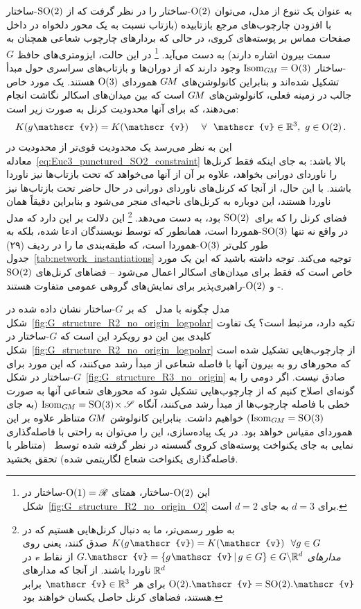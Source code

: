 به عنوان یک تنوع از مدل، می‌توان $\operatorname{O}(2)$-ساختار را در نظر گرفت که از $\operatorname{SO}(2)$-ساختار با افزودن چارچوب‌های مرجع بازتابیده (بازتاب نسبت به یک محور دلخواه در داخل صفحات مماس بر پوسته‌های کروی، در حالی که بردارهای چارچوب شعاعی همچنان به سمت بیرون اشاره دارند) به دست می‌آید.%
\footnote{
	این $\operatorname{O}(2)$-ساختار، همتای $\operatorname{O}(1) = \mathscr{R}$-ساختار در شکل~\ref{fig:G_structure_R2_no_origin_O2} برای $d=3$ به جای $d=2$ است.
}
در این حالت، ایزومتری‌های حافظ $G$-ساختار $\operatorname{Isom}_{G\mkern-1.4muM} = \operatorname{O}(3)$ وجود دارند که از دوران‌ها و بازتاب‌های سراسری حول مبدأ تشکیل شده‌اند و بنابراین کانولوشن‌های $G\mkern-1.4muM$ هموردای $\operatorname{O}(3)$ هستند.
یک مورد خاص جالب در زمینه فعلی، کانولوشن‌های $G\mkern-1.4muM$ است که بین میدان‌های اسکالر نگاشت انجام می‌دهند، که برای آنها محدودیت کرنل به صورت زیر است:
\begin{align}\label{eq:Euc3_punctured_O2_constraint}
	K(g\mkern1mu \mathscr{v}) = K(\mathscr{v}) \quad\ \forall\ \ \mathscr{v}\in\R^3,\ g\in\O2 \,.
\end{align}
این به نظر می‌رسد یک محدودیت قوی‌تر از محدودیت در معادله~\eqref{eq:Euc3_punctured_SO2_constraint} بالا باشد:
به جای اینکه فقط کرنل‌ها را ناوردای دورانی بخواهد، علاوه بر آن از آنها می‌خواهد که تحت بازتاب‌ها نیز ناوردا باشند.
با این حال، از آنجا که کرنل‌های ناوردای دورانی در حال حاضر تحت بازتاب‌ها نیز ناوردا هستند، این دوباره به کرنل‌های ناحیه‌ای منجر می‌شود و بنابراین دقیقاً همان فضای کرنل را که برای~$\operatorname{SO}(2)$ بود، به دست می‌دهد.%
\footnote{
	به طور رسمی‌تر، ما به دنبال کرنل‌هایی هستیم که در $K(g\mkern1mu \mathscr{v}) = K(\mathscr{v})\ \ \forall g\in G$ صدق کنند، یعنی روی \emph{مدارهای} $G.\mathscr{v} = \{g\mkern1mu \mathscr{v} \,|\, g\in G\} \in G \backslash \R^d$ از نقاط $\mathscr{v}$ در $\mathbb{R}^d$ ناوردا باشند.
	از آنجا که مدارهای $\O2.\mathscr{v} = \SO2.\mathscr{v}$ برای هر $\mathscr{v}\in\R^3$ برابر هستند، فضاهای کرنل حاصل یکسان خواهند بود.
}
این دلالت بر این دارد که مدل \citet{ramasinghe2019representation} در واقع نه تنها $\operatorname{SO}(3)$-هموردا است، همانطور که توسط نویسندگان ادعا شده، بلکه به طور کلی‌تر $\operatorname{O}(3)$-هموردا است، که طبقه‌بندی ما را در ردیف (۲۹) جدول~\ref{tab:network_instantiations} توجیه می‌کند.
توجه داشته باشید که این یک مورد خاص است که فقط برای میدان‌های اسکالر اعمال می‌شود -- فضاهای کرنل‌های $\operatorname{SO}(2)$- و $\operatorname{O}(2)$-راهبری‌پذیر برای نمایش‌های گروهی عمومی متفاوت هستند.


مدل \citet{ramasinghe2019representation} چگونه با مدل~\citet{esteves2017polar} که بر $G$-ساختار نشان داده شده در شکل~\ref{fig:G_structure_R2_no_origin_logpolar} تکیه دارد، مرتبط است؟
یک تفاوت کلیدی بین این دو رویکرد این است که $G$-ساختار در شکل~\ref{fig:G_structure_R2_no_origin_logpolar} از چارچوب‌هایی تشکیل شده است که محورهای رو به بیرون آنها با فاصله شعاعی از مبدأ رشد می‌کنند، که این مورد برای $G$-ساختار در شکل~\ref{fig:G_structure_R3_no_origin} صادق نیست.
اگر دومی را به گونه‌ای اصلاح کنیم که از چارچوب‌هایی تشکیل شود که محورهای شعاعی آنها به صورت خطی با فاصله چارچوب‌ها از مبدأ رشد می‌کنند، آنگاه $\operatorname{Isom}_{G\mkern-1.4muM} = \operatorname{SO}(3) \!\times \mathscr{S}$ (به جای $\operatorname{Isom}_{G\mkern-1.4muM} = \operatorname{SO}(3)$) خواهیم داشت.
بنابراین کانولوشن $G\mkern-1.4muM$ متناظر علاوه بر این هموردای مقیاس خواهد بود.
در یک پیاده‌سازی، این را می‌توان به راحتی با فاصله‌گذاری نمایی به جای یکنواخت پوسته‌های کروی گسسته در نظر گرفته شده توسط~\citet{ramasinghe2019representation} (متناظر با فاصله‌گذاری یکنواخت شعاع لگاریتمی شده) تحقق بخشید.


